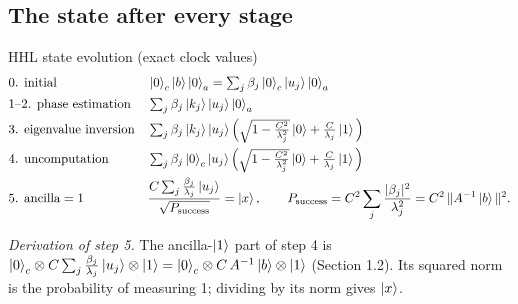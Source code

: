 \documentclass[11pt,a4paper,openany]{book}
\begin{document}
\subsection{The state after every stage}
\begin{keyres}{HHL state evolution (exact clock values)}
\begin{align*}
&\text{0. initial} && \ket0_c\ket b\ket0_a = \textstyle\sum_j\beta_j\ket0_c\ket{u_j}\ket0_a\\
&\text{1--2. phase estimation} && \textstyle\sum_j\beta_j\ket{k_j}\ket{u_j}\ket0_a\\
&\text{3. eigenvalue inversion} && \textstyle\sum_j\beta_j\ket{k_j}\ket{u_j}\Big(\sqrt{1 - \frac{C^2}{\lambda_j^2}}\ket0 + \frac{C}{\lambda_j}\ket1\Big)\\
&\text{4. uncomputation} && \textstyle\sum_j\beta_j\ket0_c\ket{u_j}\Big(\sqrt{1 - \frac{C^2}{\lambda_j^2}}\ket0 + \frac{C}{\lambda_j}\ket1\Big)\\
&\text{5. ancilla} = 1 && \dfrac{C\sum_j\frac{\beta_j}{\lambda_j}\ket{u_j}}{\sqrt{P_{\text{success}}}} = \ket x,\qquad P_{\text{success}} = C^2\sum_j\frac{|\beta_j|^2}{\lambda_j^2} = C^2\,\|A^{-1}\ket b\|^2.
\end{align*}
\end{keyres}
\emph{Derivation of step 5.} The ancilla-$\ket1$ part of step 4 is $\ket0_c\otimes C\sum_j\frac{\beta_j}{\lambda_j}\ket{u_j}\otimes\ket1 = \ket0_c\otimes C\,A^{-1}\ket b\otimes\ket1$
(Section 1.2). Its squared norm is the probability of measuring 1; dividing by its norm gives $\ket x$.
\end{document}
